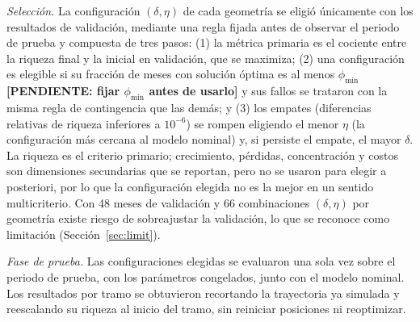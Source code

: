 \emph{Selección.} La configuración $(\delta,\eta)$ de cada geometría se eligió únicamente con los resultados de validación, mediante una regla fijada antes de observar el periodo de prueba y compuesta de tres pasos: (1) la métrica primaria es el cociente entre la riqueza final y la inicial en validación, que se maximiza; (2) una configuración es elegible si su fracción de meses con solución óptima es al menos $\phi_{\min}$ \textbf{[PENDIENTE: fijar $\phi_{\min}$ antes de usarlo]} y sus fallos se trataron con la misma regla de contingencia que las demás; y (3) los empates (diferencias relativas de riqueza inferiores a $10^{-6}$) se rompen eligiendo el menor $\eta$ (la configuración más cercana al modelo nominal) y, si persiste el empate, el mayor $\delta$. La riqueza es el criterio primario; crecimiento, pérdidas, concentración y costos son dimensiones secundarias que se reportan, pero no se usaron para elegir a posteriori, por lo que la configuración elegida no es la mejor en un sentido multicriterio. Con 48 meses de validación y 66 combinaciones $(\delta,\eta)$ por geometría existe riesgo de sobreajustar la validación, lo que se reconoce como limitación (Sección~\ref{sec:limit}).

\emph{Fase de prueba.} 
Las configuraciones elegidas se evaluaron una sola vez sobre el periodo de prueba, con los parámetros congelados, junto con el modelo nominal. Los resultados por tramo se obtuvieron recortando la trayectoria ya simulada y reescalando su riqueza al inicio del tramo, sin reiniciar posiciones ni reoptimizar.

